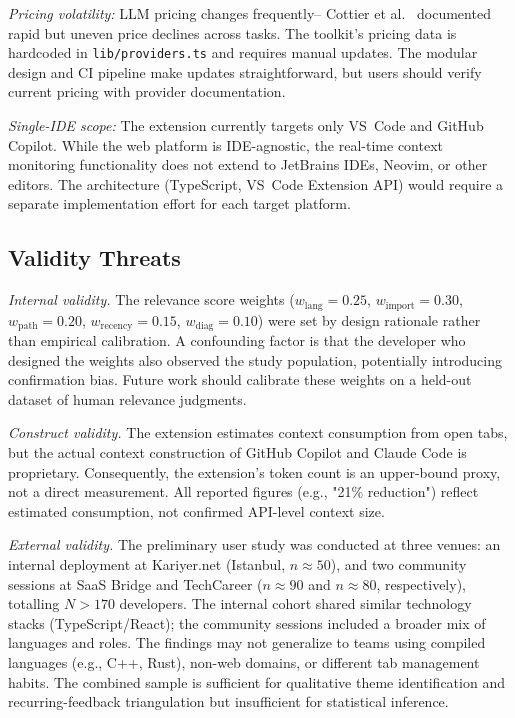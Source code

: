 \documentclass[a4paper,fleqn]{cas-dc}
\begin{document}
\textit{Pricing volatility:} LLM pricing changes frequently– Cottier et al.~\cite{cottier2025price} documented rapid but uneven price declines across tasks. The toolkit's pricing data is hardcoded in \texttt{lib/providers.ts} and requires manual updates. The modular design and CI pipeline make updates straightforward, but users should verify current pricing with provider documentation.

\textit{Single-IDE scope:} The extension currently targets only VS~Code and GitHub Copilot. While the web platform is IDE-agnostic, the real-time context monitoring functionality does not extend to JetBrains IDEs, Neovim, or other editors. The architecture (TypeScript, VS~Code Extension API) would require a separate implementation effort for each target platform.

\subsection*{Validity Threats}

\textit{Internal validity.} The relevance score weights ($w_\mathrm{lang}=0.25$, $w_\mathrm{import}=0.30$, $w_\mathrm{path}=0.20$, $w_\mathrm{recency}=0.15$, $w_\mathrm{diag}=0.10$) were set by design rationale rather than empirical calibration. A confounding factor is that the developer who designed the weights also observed the study population, potentially introducing confirmation bias. Future work should calibrate these weights on a held-out dataset of human relevance judgments.

\textit{Construct validity.} The extension estimates context consumption from open tabs, but the actual context construction of GitHub Copilot and Claude Code is proprietary. Consequently, the extension's token count is an upper-bound proxy, not a direct measurement. All reported figures (e.g., "21\% reduction") reflect estimated consumption, not confirmed API-level context size.

\textit{External validity.} The preliminary user study was conducted at three venues: an internal deployment at Kariyer.net (Istanbul, $n \approx 50$), and two community sessions at SaaS Bridge and TechCareer ($n \approx 90$ and $n \approx 80$, respectively), totalling $N > 170$ developers. The internal cohort shared similar technology stacks (TypeScript/React); the community sessions included a broader mix of languages and roles. The findings may not generalize to teams using compiled languages (e.g., C++, Rust), non-web domains, or different tab management habits. The combined sample is sufficient for qualitative theme identification and recurring-feedback triangulation but insufficient for statistical inference.
\end{document}
